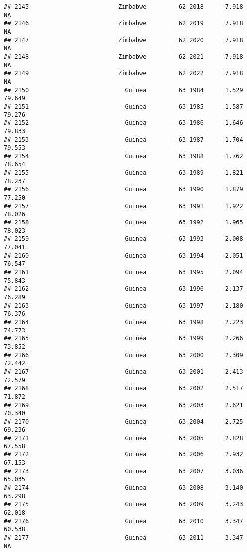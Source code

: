 \documentclass[
]{article}
\begin{document}
\begin{verbatim}
## 2145                         Zimbabwe         62 2018      7.918         NA
## 2146                         Zimbabwe         62 2019      7.918         NA
## 2147                         Zimbabwe         62 2020      7.918         NA
## 2148                         Zimbabwe         62 2021      7.918         NA
## 2149                         Zimbabwe         62 2022      7.918         NA
## 2150                           Guinea         63 1984      1.529     79.649
## 2151                           Guinea         63 1985      1.587     79.276
## 2152                           Guinea         63 1986      1.646     79.833
## 2153                           Guinea         63 1987      1.704     79.553
## 2154                           Guinea         63 1988      1.762     78.654
## 2155                           Guinea         63 1989      1.821     78.237
## 2156                           Guinea         63 1990      1.879     77.250
## 2157                           Guinea         63 1991      1.922     78.026
## 2158                           Guinea         63 1992      1.965     78.023
## 2159                           Guinea         63 1993      2.008     77.041
## 2160                           Guinea         63 1994      2.051     76.547
## 2161                           Guinea         63 1995      2.094     75.843
## 2162                           Guinea         63 1996      2.137     76.289
## 2163                           Guinea         63 1997      2.180     76.376
## 2164                           Guinea         63 1998      2.223     74.773
## 2165                           Guinea         63 1999      2.266     73.852
## 2166                           Guinea         63 2000      2.309     72.442
## 2167                           Guinea         63 2001      2.413     72.579
## 2168                           Guinea         63 2002      2.517     71.872
## 2169                           Guinea         63 2003      2.621     70.340
## 2170                           Guinea         63 2004      2.725     69.236
## 2171                           Guinea         63 2005      2.828     67.558
## 2172                           Guinea         63 2006      2.932     67.153
## 2173                           Guinea         63 2007      3.036     65.035
## 2174                           Guinea         63 2008      3.140     63.298
## 2175                           Guinea         63 2009      3.243     62.018
## 2176                           Guinea         63 2010      3.347     60.538
## 2177                           Guinea         63 2011      3.347         NA

\end{verbatim}
\end{document}
